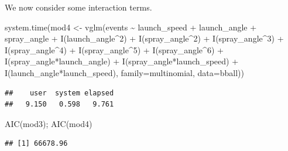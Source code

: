 \documentclass[
  ignorenonframetext,
]{beamer}
\newenvironment{Shaded}{\begin{snugshade}}{\end{snugshade}}
\newcommand{\AttributeTok}[1]{\textcolor[rgb]{0.77,0.63,0.00}{#1}}
\newcommand{\DecValTok}[1]{\textcolor[rgb]{0.00,0.00,0.81}{#1}}
\newcommand{\FunctionTok}[1]{\textcolor[rgb]{0.00,0.00,0.00}{#1}}
\newcommand{\NormalTok}[1]{#1}
\newcommand{\OtherTok}[1]{\textcolor[rgb]{0.56,0.35,0.01}{#1}}
\newcommand{\SpecialCharTok}[1]{\textcolor[rgb]{0.00,0.00,0.00}{#1}}
\begin{document}
\begin{frame}[fragile]{}
\protect\hypertarget{section-14}{}
We now consider some interaction terms.

\vspace{12pt}
\tiny

\begin{Shaded}
\begin{Highlighting}[]
\FunctionTok{system.time}\NormalTok{(mod4 }\OtherTok{\textless{}{-}} \FunctionTok{vglm}\NormalTok{(events }\SpecialCharTok{\textasciitilde{}}\NormalTok{ launch\_speed }\SpecialCharTok{+}\NormalTok{ launch\_angle }\SpecialCharTok{+}\NormalTok{ spray\_angle }\SpecialCharTok{+} 
               \FunctionTok{I}\NormalTok{(launch\_angle}\SpecialCharTok{\^{}}\DecValTok{2}\NormalTok{) }\SpecialCharTok{+} 
               \FunctionTok{I}\NormalTok{(spray\_angle}\SpecialCharTok{\^{}}\DecValTok{2}\NormalTok{) }\SpecialCharTok{+} \FunctionTok{I}\NormalTok{(spray\_angle}\SpecialCharTok{\^{}}\DecValTok{3}\NormalTok{) }\SpecialCharTok{+} \FunctionTok{I}\NormalTok{(spray\_angle}\SpecialCharTok{\^{}}\DecValTok{4}\NormalTok{) }\SpecialCharTok{+} 
               \FunctionTok{I}\NormalTok{(spray\_angle}\SpecialCharTok{\^{}}\DecValTok{5}\NormalTok{) }\SpecialCharTok{+} \FunctionTok{I}\NormalTok{(spray\_angle}\SpecialCharTok{\^{}}\DecValTok{6}\NormalTok{) }\SpecialCharTok{+} 
               \FunctionTok{I}\NormalTok{(spray\_angle}\SpecialCharTok{*}\NormalTok{launch\_angle) }\SpecialCharTok{+} \FunctionTok{I}\NormalTok{(spray\_angle}\SpecialCharTok{*}\NormalTok{launch\_speed) }\SpecialCharTok{+} 
               \FunctionTok{I}\NormalTok{(launch\_angle}\SpecialCharTok{*}\NormalTok{launch\_speed), }
             \AttributeTok{family=}\NormalTok{multinomial, }\AttributeTok{data=}\NormalTok{bball))}
\end{Highlighting}
\end{Shaded}

\begin{verbatim}
##    user  system elapsed 
##   9.150   0.598   9.761
\end{verbatim}

\begin{Shaded}
\begin{Highlighting}[]
\FunctionTok{AIC}\NormalTok{(mod3); }\FunctionTok{AIC}\NormalTok{(mod4)}
\end{Highlighting}
\end{Shaded}

\begin{verbatim}
## [1] 66678.96
\end{verbatim}


\end{frame}
\end{document}
